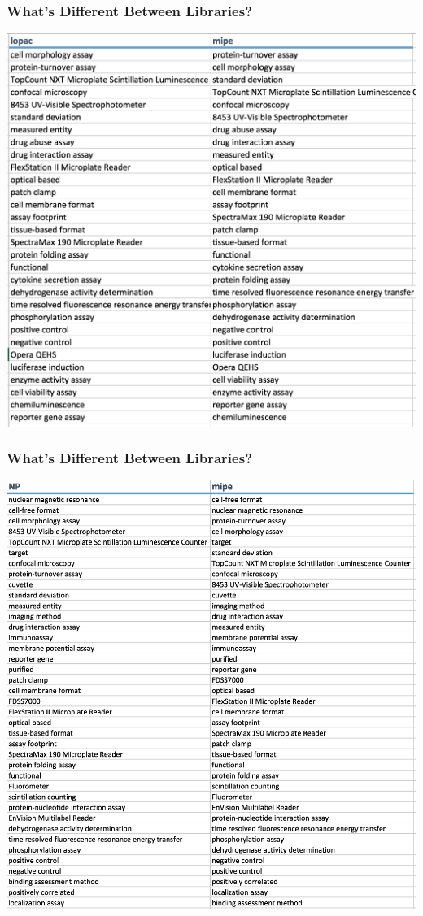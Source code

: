 \documentclass[anchorcolor=blue,linkcolor=blue]{beamer}
\begin{document}
  \begin{frame}
    \frametitle{What's Different Between Libraries?}
    \begin{center}
      \includegraphics[height=0.9\textheight]{img-diff-lopac-vs-mipe}
    \end{center}
  \end{frame}
  \begin{frame}
    \frametitle{What's Different Between Libraries?}
    \begin{center}
      \includegraphics[height=0.9\textheight]{img-diff-np-vs-mipe}
    \end{center}

  \end{frame}
\end{document}
